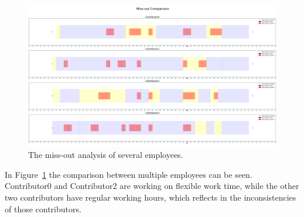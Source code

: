\begin{figure}[H]
    \includegraphics[scale=0.20]{./graphs/analysis/work-time-analysis-comparison}
    \centering
    \caption{The miss-out analysis of several employees.}\label{fig:miss-out-comparison}
\end{figure}

In Figure~\ref{fig:miss-out-comparison} the comparison between multiple employees can be seen.
Contributor0 and Contributor2 are working on flexible work time, while the other two contributors have regular working hours, which reflects in the inconsistencies of those contributors.
